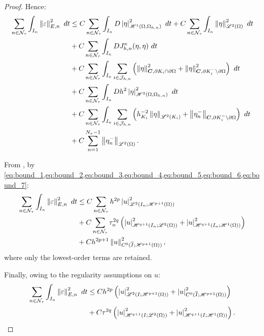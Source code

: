 \begin{proof}
    Hence:
    \begin{align*}
        \sum_{n \in \mathcal{N}_{\tau}} \int_{I_n} \left\lVert \varepsilon \right\rVert_{E, n}^2 ~ dt &\leq C \sum_{n \in \mathcal{N}_{\tau}} \int_{I_n} D \left\lvert \eta \right\rvert_{\mathscr{H}^{1}(\Omega, \Omega_{h, n})}^2 ~ dt + C \sum_{n \in \mathcal{N}_{\tau}} \int_{I_n} \left\lVert \eta \right\rVert_{\mathscr{L}^{2}(\Omega)}^2 ~ dt \\
        &+ C \sum_{n \in \mathcal{N}_{\tau}} \int_{I_n} D J^{\kappa}_{h, n}(\eta, \eta) ~ dt \\
        &+ C \sum_{n \in \mathcal{N}_{\tau}} \int_{I_n} \sum_{i \in \mathcal{J}_{h, n}} \left( \left\lVert \eta \right\rVert_{\bm{C}, \partial K_i \cap \partial \Omega}^2 + \left\lVert \eta \right\rVert_{\bm{C}, \partial K_i^- \setminus \partial \Omega}^2 \right) ~ dt \\
        &+ C \sum_{n \in \mathcal{N}_{\tau}} \int_{I_n} D h^2 \left\lvert \eta \right\rvert_{\mathscr{H}^{2}(\Omega, \Omega_{h, n})}^2 ~ dt \\
        &+ C \sum_{n \in \mathcal{N}_{\tau}} \int_{I_n} \sum_{i \in \mathcal{J}_{h, n}} \left( h_{K_i}^{-2} \left\lVert \eta \right\rVert_{\mathscr{L}^{2}(K_i)} + \left\lVert \eta_n^- \right\rVert_{\bm{C}, \partial K_i^- \setminus \partial \Omega} \right) ~ dt \\
        &+ C \sum_{n = 1}^{N_{\tau} - 1} \left\lVert \eta_n^- \right\rVert_{\mathscr{L}^{2}(\Omega)}.
    \end{align*}

    From , by \cref{eq:bound_1,eq:bound_2,eq:bound_3,eq:bound_4,eq:bound_5,eq:bound_6,eq:bound_7}:
    \begin{align*}
        \sum_{n \in \mathcal{N}_{\tau}} \int_{I_n} \left\lVert \varepsilon \right\rVert_{E, n}^2 ~ dt &\leq C \sum_{n \in \mathcal{N}_{\tau}} h^{2p} \left\lvert u \right\rvert_{\mathscr{L}^{2}(I_n; \mathscr{H}^{p + 1}(\Omega))}^2 \\
        &+ C \sum_{n \in \mathcal{N}_{\tau}} \tau_n^{2 q} \left( \left\lvert u \right\rvert_{\mathscr{H}^{q + 1}(I_n; \mathscr{L}^{2}(\Omega))}^2 + \left\lvert u \right\rvert_{\mathscr{H}^{q + 1}(I_n; \mathscr{H}^{1}(\Omega))}^2 \right) \\
        &+ C h^{2p + 1} \left\lVert u \right\rVert_{C^0(\overline{I}; \mathscr{H}^{p + 1}(\Omega))}^2,
    \end{align*}
    where only the lowest-order terms are retained.

    Finally, owing to the regularity assumptions on $u$:
    \begin{align*}
        \sum_{n \in \mathcal{N}_{\tau}} \int_{I_n}  \left\lVert \varepsilon \right\rVert_{E, n}^2  ~ d t &\leq C h^{2p} \left( \left\lvert u \right\rvert_{\mathscr{L}^{2}(I; \mathscr{H}^{p + 1}(\Omega))}^2 + \left\lvert u \right\rvert_{C^0(\overline{I}; \mathscr{H}^{p + 1}(\Omega))}^2 \right) \\
        &+ C \tau^{2q} \left( \left\lvert u \right\rvert_{\mathscr{H}^{q + 1}(I; \mathscr{L}^{2}(\Omega))}^2 + \left\lvert u \right\rvert_{\mathscr{H}^{q + 1}(I; \mathscr{H}^{1}(\Omega))}^2 \right).
    \end{align*}
\end{proof}